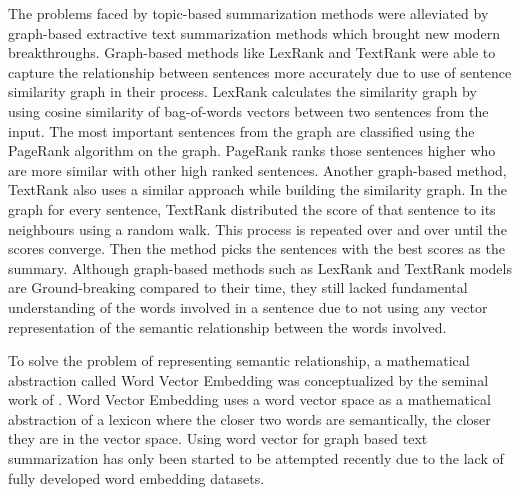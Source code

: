 \documentclass[acmlarge]{acmart}
\begin{document}
The problems faced by topic-based summarization methods were alleviated by graph-based extractive text summarization methods which brought new modern breakthroughs. Graph-based methods like LexRank \cite{Erkan-lexRank-2004} and TextRank \cite{mihalcea-2004-textrank} were able to capture the relationship between sentences more accurately due to use of sentence similarity graph in their process. LexRank \cite{Erkan-lexRank-2004} calculates the similarity graph by using cosine similarity of bag-of-words vectors between two sentences from the input. The most important sentences from the graph are classified using the PageRank \cite{page-PageRank-1999} algorithm on the graph. PageRank ranks those sentences higher who are more similar with other high ranked sentences. Another graph-based method, TextRank \cite{mihalcea-2004-textrank} also uses a similar approach while building the similarity graph. In the graph for every sentence, TextRank distributed the score of that sentence to its neighbours using a random walk. This process is repeated over and over until the scores converge. Then the method picks the sentences with the best scores as the summary. Although graph-based methods such as LexRank and TextRank models are Ground-breaking compared to their time, they still lacked fundamental understanding of the words involved in a sentence due to not using any vector representation of the semantic relationship between the words involved.

To solve the problem of representing semantic relationship, a mathematical abstraction called Word Vector Embedding was conceptualized by the seminal work of \citeauthor{salton-1975-word-vector} \cite{salton-1975-word-vector}. Word Vector Embedding uses a word vector space as a mathematical abstraction of a lexicon where the closer two words are semantically, the closer they are in the vector space. Using word vector for graph based text summarization has only been started to be attempted recently \cite{Jain-2017-word-vector-embedding-summary} due to the lack of fully developed word embedding datasets.
\end{document}
